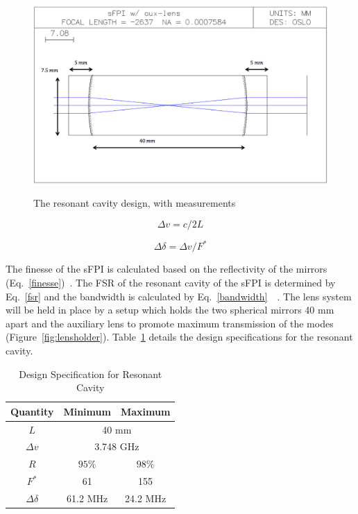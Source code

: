 \documentclass[12pt]{report}
\begin{document}
\begin{figure}[h!]
  \centering
	\includegraphics[width=5in]{sfpi_layout.png}\\
	\caption[Resonant Cavity Design]{The resonant cavity design, with measurements}
	\label{fig:auxlens}
\end{figure}

\begin{equation}
\Delta v = c/2L
\label{fsr}
\end{equation}

\begin{equation}
\Delta \delta = \Delta v/F^*
\label{bandwidth}
\end{equation}

The finesse of the sFPI is calculated based on the reflectivity of the mirrors (Eq.~\ref{finesse})~\cite{website}. The FSR of the resonant cavity of the sFPI is determined by Eq.~\ref{fsr} and the bandwidth is calculated by Eq.~\ref{bandwidth}~\cite{jenkinsnwhite}~\cite{optics}. The lens system will be held in place by a setup which holds the two spherical mirrors 40 mm apart and the auxiliary lens to promote maximum transmission of the modes (Figure~\ref{fig:lensholder}). Table~\ref{rescav} details the design specifications for the resonant cavity.

\begin{table}[!htpb]
\begin{center}
\begin{tabular}{*3c}
\toprule 
  Quantity & Minimum & Maximum \\ 
  \midrule 
  $L$ & \multicolumn{2}{c}{40 mm}\\  
  $\Delta v$ & \multicolumn{2}{c}{3.748 GHz}\\
  $R$ & $95 \%$ & $98\%$\\           
  $F^*$ & 61 & 155 \\
  $\Delta \delta$ & 61.2 MHz & 24.2 MHz\\
  \bottomrule 
\end{tabular}
\caption{Design Specification for Resonant Cavity}
\label{rescav}
\end{center}
\end{table}
\end{document}

